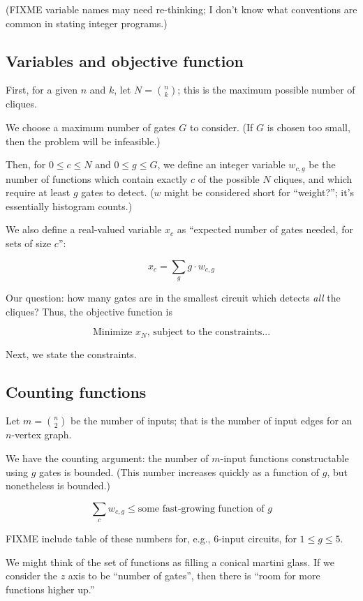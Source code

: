 \documentclass[12pt]{article}
\theoremstyle{definition}
\begin{document}
(FIXME variable names may need re-thinking; I don't know what
conventions are common in stating integer programs.)

\subsection{Variables and objective function}

First, for a given $n$ and $k$, let $N = {n \choose k}$; this is
the maximum possible number of cliques.

We choose a maximum number of gates $G$ to consider. (If $G$ is
chosen too small, then the problem will be infeasible.)

Then, for $0 \le c \le N$ and $0 \le g \le G$,
we define an integer variable $w_{c,g}$ be the number of functions which contain
exactly $c$ of the possible $N$ cliques, and which require at least
$g$ gates to detect. ($w$ might be considered short for ``weight?'';
it's essentially histogram counts.)

We also define a real-valued variable
$x_c$ as ``expected number of gates needed, for sets of size $c$'':

\[
x_c = \sum_g g \cdot w_{c,g}
\]

Our question: how many gates are in the smallest circuit
which detects {\em all} the cliques? Thus, the objective function
is

\[
\text{Minimize }x_N\text{, subject to the constraints...}
\]

Next, we state the constraints.

\subsection{Counting functions}

Let $m = {n \choose 2}$ be the number of inputs; that is the number
of input edges for an $n$-vertex graph.

We have the counting argument: the number of $m$-input functions
constructable using $g$ gates is bounded. (This number increases
quickly as a function of $g$, but nonetheless is bounded.)

\[
\sum_c w_{c,g} \le \text{some fast-growing function of }g
\]

FIXME include table of these numbers for, e.g., 6-input circuits,
for $1 \le g \le 5$.

We might think of the set of functions as filling a conical
martini glass. If we consider the $z$ axis to be ``number of gates'',
then there is ``room for more functions higher up.''
\end{document}
